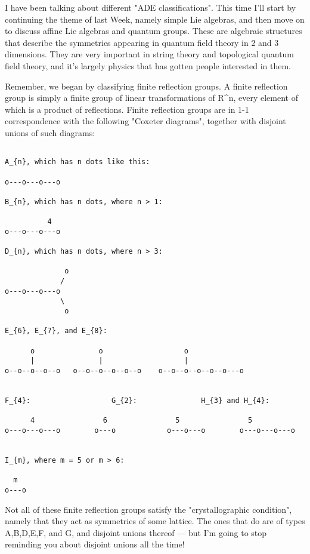 

I have been talking about different "ADE classifications".  This time
I'll start by continuing the theme of last Week, namely simple Lie
algebras, and then move on to discuss affine Lie algebras and quantum
groups.  These are algebraic structures that describe the symmetries
appearing in quantum field theory in 2 and 3 dimensions.  They are very
important in string theory and topological quantum field theory, and
it's largely physics that has gotten people interested in them.

Remember, we began by classifying finite reflection groups.  A finite
reflection group is simply a finite group of linear transformations of
R^{n}, every element of which is a product of reflections.  Finite
reflection groups are in 1-1 correspondence with the following "Coxeter
diagrams", together with disjoint unions of such diagrams:


\begin{verbatim}

A_{n}, which has n dots like this:

o---o---o---o

B_{n}, which has n dots, where n > 1:

          4
o---o---o---o

D_{n}, which has n dots, where n > 3:

              o
             /
o---o---o---o
             \
              o

E_{6}, E_{7}, and E_{8}:

      o               o                   o
      |               |                   |
o--o--o--o--o   o--o--o--o--o--o    o--o--o--o--o--o---o


F_{4}:                   G_{2}:               H_{3} and H_{4}:

      4                6                5                5
o---o---o---o        o---o            o---o---o        o---o---o---o


I_{m}, where m = 5 or m > 6:

  m
o---o
\end{verbatim}
    

Not all of these finite reflection groups satisfy the "crystallographic
condition", namely that they act as symmetries of some lattice.  The
ones that do are of types A,B,D,E,F, and G, and disjoint unions thereof
--- but I'm going to stop reminding you about disjoint unions all the
time!

